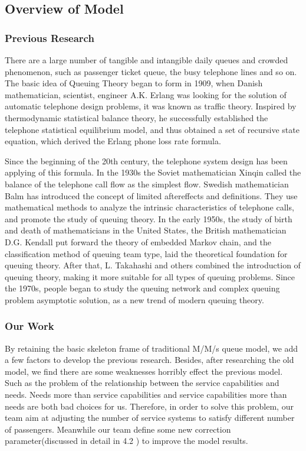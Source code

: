 \documentclass{mcmthesis}
\begin{document}
\subsection{Overview of Model}%
\subsubsection{Previous Research}
There are a large number of tangible and intangible daily queues and crowded phenomenon, such as passenger ticket queue, the busy telephone lines and so on. The basic idea of Queuing Theory began to form in 1909, when Danish mathematician, scientist, engineer A.K. Erlang was looking for the solution of automatic telephone design problems, it was known as traffic theory. Inspired by thermodynamic statistical balance theory, he successfully established the telephone statistical equilibrium model, and thus obtained a set of recursive state equation, which derived the Erlang phone loss rate formula.

Since the beginning of the 20th century, the telephone system design has been applying of this formula. In the 1930s the Soviet mathematician Xinqin called the balance of the telephone call flow as the simplest flow. Swedish mathematician Balm has introduced the concept of limited aftereffects and definitions. They use mathematical methods to analyze the intrinsic characteristics of telephone calls, and promote the study of queuing theory. In the early 1950s, the study of birth and death of mathematicians in the United States, the British mathematician D.G. Kendall put forward the theory of embedded Markov chain, and the classification method of queuing team type, laid the theoretical foundation for queuing theory. After that, L. Takahashi and others combined the introduction of queuing theory, making it more suitable for all types of queuing problems. Since the 1970s, people began to study the queuing network and complex queuing problem asymptotic solution, as a new trend of modern queuing theory.

\subsubsection{Our Work}
By retaining the basic skeleton frame of traditional M/M/s queue model, we add a few factors to develop the previous research. Besides, after researching the old model, we find there are some weaknesses horribly effect the previous model. Such as the problem of the relationship between the service capabilities and needs. Needs more than service capabilities and service capabilities more than needs are both bad choices for us. Therefore, in order to solve this problem, our team aim at adjusting the number of service systems to satisfy different number of passengers. Meanwhile our team define some new correction parameter(discussed in detail in 4.2 ) to improve the model results.
\end{document}
